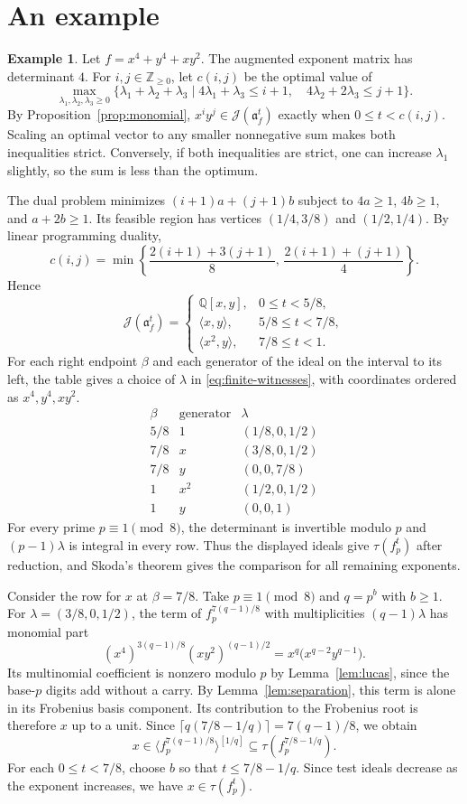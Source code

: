 \documentclass[11pt]{amsart}
\numberwithin{equation}{section}
\theoremstyle{definition}
\newtheorem{example}[theorem]{Example}
\newcommand{\J}{\mathcal J}
\newcommand{\aideal}{\mathfrak a}
\newcommand{\Q}{\mathbb Q}
\newcommand{\Z}{\mathbb Z}
\begin{document}
\section{An example}

\begin{example}
Let $f=x^4+y^4+xy^2$. The augmented exponent matrix has determinant $4$.
For $i,j\in\Z_{\ge 0}$, let $c(i,j)$ be the optimal value of
\[
 \max_{\lambda_1,\lambda_2,\lambda_3\ge0}
 \{\lambda_1+\lambda_2+\lambda_3\mid
 4\lambda_1+\lambda_3\le i+1,\quad 4\lambda_2+2\lambda_3\le j+1\}.
\]
By Proposition~\ref{prop:monomial}, $x^iy^j\in\J(\aideal_f^t)$
exactly when $0\le t<c(i,j)$. Scaling an optimal vector to any smaller
nonnegative sum makes both inequalities strict. Conversely, if both
inequalities are strict, one can increase $\lambda_1$ slightly,
so the sum is less than the optimum.

The dual problem minimizes $(i+1)a+(j+1)b$ subject to
$4a\ge1$, $4b\ge1$, and $a+2b\ge1$. Its feasible region has vertices
$(1/4,3/8)$ and $(1/2,1/4)$. By linear programming duality,
\[
 c(i,j)=\min\left\{\frac{2(i+1)+3(j+1)}8,\,
                         \frac{2(i+1)+(j+1)}4\right\}.
\]
Hence
\[
 \J(\aideal_f^t)=\begin{cases}
 \Q[x,y],&0\le t<5/8,\\
 \langle x,y\rangle,&5/8\le t<7/8,\\
 \langle x^2,y\rangle,&7/8\le t<1.
 \end{cases}
\]
For each right endpoint $\beta$ and each generator of the ideal on
the interval to its left, the table gives a choice of $\lambda$ in
\eqref{eq:finite-witnesses}, with coordinates ordered as $x^4,y^4,xy^2$.
\[
\begin{array}{c|c|c}
 \beta&\text{generator}&\lambda\\ \hline
 5/8&1&(1/8,0,1/2)\\
 7/8&x&(3/8,0,1/2)\\
 7/8&y&(0,0,7/8)\\
 1&x^2&(1/2,0,1/2)\\
 1&y&(0,0,1)
\end{array}
\]
For every prime $p\equiv1\pmod8$, the determinant is invertible modulo
$p$ and $(p-1)\lambda$ is integral in every row. Thus the displayed
ideals give $\tau(f_p^t)$ after reduction, and Skoda's theorem gives
the comparison for all remaining exponents.

Consider the row for $x$ at $\beta=7/8$. Take $p\equiv1\pmod8$ and
$q=p^b$ with $b\ge1$. For $\lambda=(3/8,0,1/2)$, the term of
$f_p^{7(q-1)/8}$ with multiplicities $(q-1)\lambda$ has monomial part
\[
 (x^4)^{3(q-1)/8}(xy^2)^{(q-1)/2}
 =x^q\bigl(x^{q-2}y^{q-1}\bigr).
\]
Its multinomial coefficient is nonzero modulo $p$ by
Lemma~\ref{lem:lucas}, since the base-$p$ digits add without a carry.
By Lemma~\ref{lem:separation}, this term is alone in its Frobenius basis
component. Its contribution to the Frobenius root is therefore $x$ up
to a unit. Since $\lceil q(7/8-1/q)\rceil=7(q-1)/8$, we obtain
\[
 x\in\langle f_p^{7(q-1)/8}\rangle^{[1/q]}
 \subseteq\tau(f_p^{7/8-1/q}).
\]
For each $0\le t<7/8$, choose $b$ so that $t\le7/8-1/q$.
Since test ideals decrease as the exponent increases,
we have $x\in\tau(f_p^t)$. 
\end{example}
\end{document}
